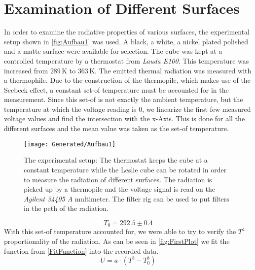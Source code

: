 \documentclass[a4paper,10pt,twocolumn]{article}
\begin{document}
    \section{Examination of Different Surfaces}\label{sec:ExaminationOfDifferentSurfaces}
    In order to examine the radiative properties of various surfaces, the experimental setup shown in \autoref{fig:Aufbau1} was used.
    A black, a white, a nickel plated polished and a matte surface were available for selection. 
    The cube was kept at a controlled temperature by a thermostat from \textit{Lauda E100}.
    This temperature was increased from $ 289\,$K to $363\,$K.
    The emitted thermal radiation was measured with a thermophile.
    Due to the construction of the thermopile, which makes use of the Seebeck effect, a constant set-of temperature must be accounted for in the measurement.
    Since this set-of is not exactly the ambient temperature, but the temperature at which the voltage reading is $0$, we linearize the first few measured voltage values 
    and find the intersection with the x-Axis.
    This is done for all the different surfaces and the mean value was taken as the set-of temperature.
    \begin{figure}
        \begin{center}
            \texttt{[image: Generated/Aufbau1]}
            \caption{The experimental setup: The thermostat keeps the cube at a constant temperature while the Leslie 
            cube can be rotated in order to measure the radiation of different surfaces.
            The radiation is picked up by a thermopile and the voltage signal is read on the \textit{Agilent 34405 A} multimeter.
            The filter rig can be used to put filters in the peth of the radiation.}
            \label{fig:Aufbau1}
        \end{center}
    \end{figure}
    \begin{equation}\label{SetofTemp}
        T_0 = 292.5 \pm 0.4
    \end{equation}
    With this set-of temperature accounted for, we were able to try to verify the $T^4$ proportionality of the radiation.
    As can be seen in \autoref{fig:FirstPlot} we fit the function from \autoref{FitFunction} into the recorded data.
    \begin{equation}\label{FitFunction}
        U = a\cdot (T^b - T_0^b)
    \end{equation}
    
\end{document}
